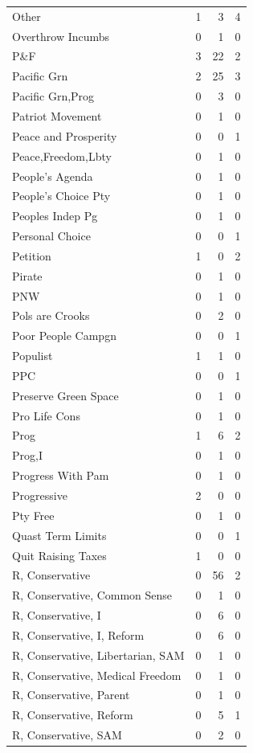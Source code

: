 \begin{supertabular}{lrrr}
Other & 1 & 3 & 4\\
Overthrow Incumbs & 0 & 1 & 0\\
P\&F & 3 & 22 & 2\\
Pacific Grn & 2 & 25 & 3\\
Pacific Grn,Prog & 0 & 3 & 0\\
Patriot Movement & 0 & 1 & 0\\
Peace and Prosperity & 0 & 0 & 1\\
Peace,Freedom,Lbty & 0 & 1 & 0\\
People's Agenda & 0 & 1 & 0\\
People's Choice Pty & 0 & 1 & 0\\
Peoples Indep Pg & 0 & 1 & 0\\
Personal Choice & 0 & 0 & 1\\
Petition & 1 & 0 & 2\\
Pirate & 0 & 1 & 0\\
PNW & 0 & 1 & 0\\
Pols are Crooks & 0 & 2 & 0\\
Poor People Campgn & 0 & 0 & 1\\
Populist & 1 & 1 & 0\\
PPC & 0 & 0 & 1\\
Preserve Green Space & 0 & 1 & 0\\
Pro Life Cons & 0 & 1 & 0\\
Prog & 1 & 6 & 2\\
Prog,I & 0 & 1 & 0\\
Progress With Pam & 0 & 1 & 0\\
Progressive & 2 & 0 & 0\\
Pty Free & 0 & 1 & 0\\
Quast Term Limits & 0 & 0 & 1\\
Quit Raising Taxes & 1 & 0 & 0\\
R, Conservative & 0 & 56 & 2\\
R, Conservative, Common Sense & 0 & 1 & 0\\
R, Conservative, I & 0 & 6 & 0\\
R, Conservative, I, Reform & 0 & 6 & 0\\
R, Conservative, Libertarian, SAM & 0 & 1 & 0\\
R, Conservative, Medical Freedom & 0 & 1 & 0\\
R, Conservative, Parent & 0 & 1 & 0\\
R, Conservative, Reform & 0 & 5 & 1\\
R, Conservative, SAM & 0 & 2 & 0\\

\end{supertabular}

